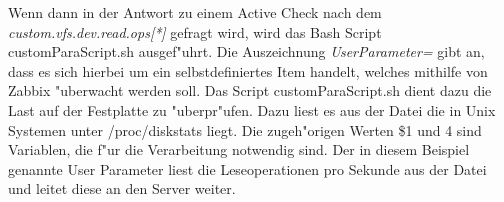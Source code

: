 Wenn dann in der Antwort zu einem Active Check nach dem \emph{custom.vfs.dev.read.ops[*]} gefragt wird, wird das Bash Script customParaScript.sh %
ausgef"uhrt. Die Auszeichnung \emph{UserParameter=} gibt an, dass es sich hierbei um ein selbstdefiniertes Item handelt, welches mithilfe von Zabbix %
"uberwacht werden soll. Das Script customParaScript.sh dient dazu die Last auf der Festplatte zu "uberpr"ufen. %
Dazu liest es aus der Datei die in Unix Systemen unter /proc/diskstats liegt. Die zugeh"origen Werten \$1 und 4 sind Variablen, die f"ur die %
Verarbeitung notwendig sind. Der in diesem Beispiel genannte User Parameter liest die Leseoperationen pro Sekunde aus der Datei und leitet diese %
an den Server weiter.


